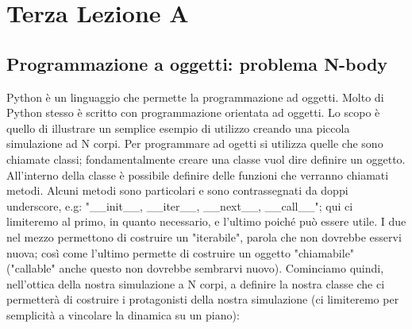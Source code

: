 \documentclass[10pt,a4paper]{article}
\begin{document}
\section{Terza Lezione A}
\subsection{Programmazione a oggetti: problema N-body}
Python è un linguaggio che permette la programmazione ad oggetti. Molto di Python stesso è scritto con programmazione orientata ad oggetti. Lo scopo è quello di illustrare un semplice esempio di utilizzo creando una piccola simulazione ad N corpi. Per programmare ad ogetti si utilizza quelle che sono chiamate classi; fondamentalmente creare una classe vuol dire definire un oggetto. All'interno della classe è possibile definire delle funzioni che verranno chiamati metodi. Alcuni metodi sono particolari e sono contrassegnati da doppi underscore, e.g: "\_\_init\_\_, \_\_iter\_\_, \_\_next\_\_, \_\_call\_\_"; qui ci limiteremo al primo, in quanto necessario, e l'ultimo poiché può essere utile. I due nel mezzo permettono di costruire un "iterabile", parola che non dovrebbe esservi nuova; così come l'ultimo permette di costruire un oggetto "chiamabile" ("callable" anche questo non dovrebbe sembrarvi nuovo). Cominciamo quindi, nell'ottica della nostra simulazione a N corpi, a definire la nostra classe che ci permetterà di costruire i protagonisti della nostra simulazione (ci limiteremo per semplicità a vincolare la dinamica su un piano):
\end{document}
